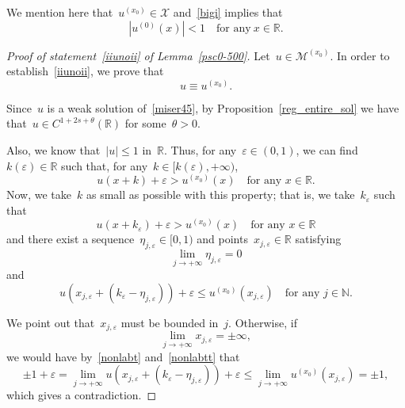 \documentclass[10pt,a4paper]{amsart}
\numberwithin{equation}{section}
\newcommand{\R}{\mathbb{R}}
\newcommand{\N}{\mathbb{N}}
\renewcommand{\epsilon}{\varepsilon}
\begin{document}
We mention here that~$u^{(x_0)} \in \mathcal{X}$ and~\eqref{bigi}  implies that
\begin{equation}\label{big}
|u^{(0)}(x) | < 1 \quad\mbox{for any} \ x \in \R.
\end{equation}

\begin{proof}[Proof of statement~\eqref{iiunoii} of Lemma~\eqref{psc0-500}]
Let~$u \in \mathscr{M}^{(x_0)}$.
In order to establish~\eqref{iiunoii}, we prove that
\begin{equation}\label{aAGTTET54y547u65uJK}
u \equiv u^{(x_0)}.\end{equation}

Since~$u$ is a weak solution of~\eqref{miser45}, by Proposition~\ref{reg_entire_sol} we have that~$u \in C^{1+2s+\theta}(\R)$ for some~$\theta>0$.

Also, we know that~$|u | \leq 1$ in~$\R$. Thus, for any~$\epsilon\in(0,1)$, we can find~$k(\epsilon)\in\R$ such that, for any~$k \in [k(\epsilon),+\infty)$,
\begin{equation*}
u(x+k)+\epsilon > u^{(x_0)}(x) \quad\mbox{for any } x \in \R.
\end{equation*}
Now, we take~$k$ as small as possible with this property; that is, we take~$k_{\epsilon}$ such that
\begin{equation}\label{nonlab}
u(x+k_{\epsilon})+\epsilon > u^{(x_0)}(x) 
\quad\mbox{for any } x \in \R
\end{equation}
and there exist a sequence~$\eta_{j,\epsilon}\in[ 0,1)$ and  points~$x_{j,\epsilon} \in \R$ satisfying
\begin{equation}\label{nonlabt}
\lim_{j \to +\infty}\eta_{j,\epsilon}=0
\end{equation}
and
\begin{equation}\label{nonlabtt}
u(x_{j,\epsilon}+(k_{\epsilon}-\eta_{j,\epsilon})) +\epsilon \leq  u^{(x_0)}(x_{j,\epsilon})\quad\mbox{for any }j \in \N.
\end{equation}

We point out that~$x_{j,\epsilon}$ must be bounded in~$j$. Otherwise, if
\begin{equation*}
\lim_{j \to  +\infty} x_{j, \epsilon}= \pm \infty,
\end{equation*}
we would have by~\eqref{nonlabt} and~\eqref{nonlabtt} that
\begin{equation*}
\pm 1+\epsilon = \lim_{j \to + \infty} u(x_{j,\epsilon}+(k_{\epsilon} -\eta_{j,\epsilon})) +\epsilon \leq  \lim_{j \to + \infty} u^{(x_0)}(x_{j,\epsilon}) = \pm 1,
\end{equation*}
which gives a contradiction. 


\end{proof}
\end{document}
